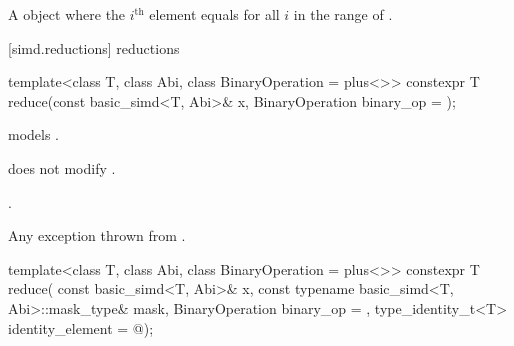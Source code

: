 \begin{itemdescr}
\pnum
\returns
A  object where the $i^\text{th}$ element equals
 for all $i$ in the range of
.
\end{itemdescr}

[simd.reductions]{ reductions}

\begin{itemdecl}
template<class T, class Abi, class BinaryOperation = plus<>>
  constexpr T reduce(const basic_simd<T, Abi>& x, BinaryOperation binary_op = {});
\end{itemdecl}

\begin{itemdescr}
\pnum
\constraints
{} models
.

\pnum
\expects
{} does not modify .

\pnum
\returns
{}.

\pnum
\throws
Any exception thrown from .
\end{itemdescr}

\begin{itemdecl}
template<class T, class Abi, class BinaryOperation = plus<>>
  constexpr T reduce(
    const basic_simd<T, Abi>& x, const typename basic_simd<T, Abi>::mask_type& mask,
    BinaryOperation binary_op = {}, type_identity_t<T> identity_element = @\seebelow@);
\end{itemdecl}

